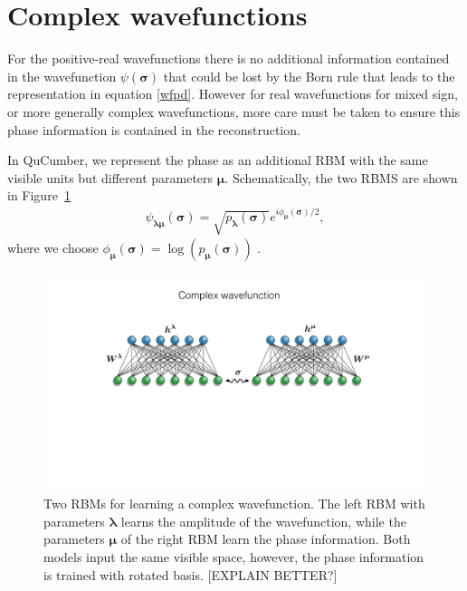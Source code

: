 \documentclass[submission, Phys]{SciPost}
\begin{document}
\section{Complex wavefunctions}
\label{Sec:Training_QuCumber_on_complex_wavefunctions}

For the positive-real wavefunctions there is no additional information contained in the wavefunction
$\psi( \boldsymbol{\sigma})$ that could be lost by the Born rule that leads to the representation in equation \ref{wfpd}.
However for real wavefunctions for mixed sign, or more generally complex wavefunctions, more care must be taken to ensure 
this phase information is contained in the reconstruction.  

In QuCumber, we represent the phase as an additional RBM with the same visible units but different parameters $\bm{\mu}$. Schematically, the two RBMS are shown in Figure~\ref{fig:complex}
\begin{align}
	\psi_{\bm{\lambda} \bm{\mu}} (\bm{\sigma})= \sqrt{p_{\bm{\lambda}} (\bm{\sigma})} e^{i \phi_{\bm{\mu}} (\bm{\sigma})/2},
\end{align}
%
where we choose $\phi_{\bm{\mu}}(\bm{\sigma}) = \log (p_{\bm{\mu}} (\bm{\sigma}))$ \cite{torlai2018tomography}. 

\begin{figure}[htpb]
    \centering
    \includegraphics[width=1\linewidth]{plots/ch3_complexNW.pdf}
    \caption{Two RBMs for learning a complex wavefunction. The left RBM with parameters $\bm{\lambda}$ learns the amplitude of the wavefunction, while the parameters $\bm{\mu}$ of the right RBM learn the phase information. Both models input the same visible space, however, the phase information is trained with rotated basis. [EXPLAIN BETTER?]}
    \label{fig:complex}
\end{figure}
\end{document}
